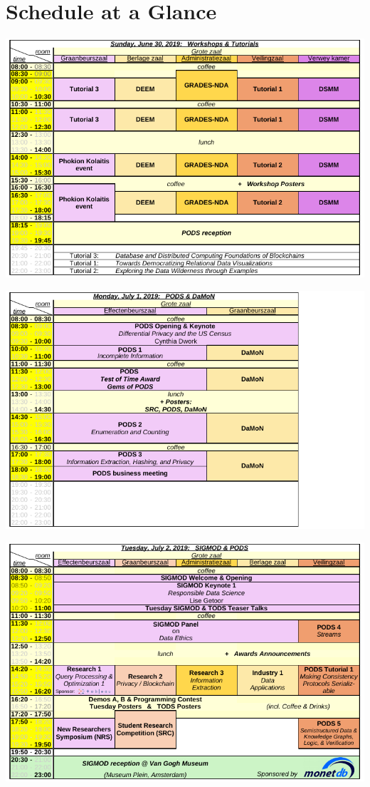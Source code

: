 
\clearpage
\ifodd\value{page}\hbox{}\newpage\fi

\section{Schedule at a Glance}


\includegraphics[angle=90,width=\textwidth]{schedule/p1.pdf}%

\includegraphics[angle=90,width=\textwidth]{schedule/p2.pdf}%

\includegraphics[angle=90,width=\textwidth]{schedule/p3.pdf}%

